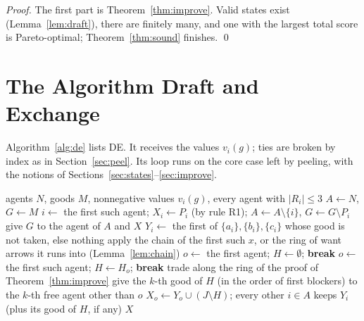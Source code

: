 \documentclass[runningheads,11pt]{llncs}
\newcommand{\DE}{\textup{DE}}
\begin{document}
\begin{proof}
The first part is Theorem~\ref{thm:improve}. Valid states exist (Lemma~\ref{lem:draft}), there are finitely many, and one with the largest total score is Pareto-optimal; Theorem~\ref{thm:sound} finishes. \qed
\end{proof}

\section{The Algorithm Draft and Exchange}\label{sec:algo}

Algorithm~\ref{alg:de} lists \DE{}. It receives the values $v_i(g)$; ties are broken by index as in Section~\ref{sec:peel}. Its loop runs on the core case left by peeling, with the notions of Sections~\ref{sec:states}--\ref{sec:improve}.

\begin{algorithm}[tb]
\caption{Draft and Exchange (\DE{})}\label{alg:de}
\begin{algorithmic}[1]
\Require agents $N$, goods $M$, nonnegative values $v_i(g)$, every agent with $|R_i|\le3$
\State $A\gets N$, $G\gets M$
 
  \State $i\gets$ the first such agent; $X_i\gets P_i$ (by rule R1); $A\gets A\setminus\{i\}$, $G\gets G\setminus P_i$
\EndWhile
{} give $G$ to the agent of $A$ and \Return $X$ \EndIf
{} 
  \State $Y_i\gets$ the first of $\{a_i\},\{b_i\},\{c_i\}$ whose good is not taken, else nothing
\EndFor
\Loop
   
    \State apply the chain of the first such $x$, or the ring of want arrows it runs into (Lemma~\ref{lem:chain})
   
    \State $o\gets$ the first agent; $H\gets\emptyset$; \textbf{break}
   
    \State $o\gets$ the first such agent; $H\gets H_o$; \textbf{break}
  \Else {}
    \State trade along the ring of the proof of Theorem~\ref{thm:improve}
  \EndIf
\EndLoop
\State give the $k$-th good of $H$ (in the order of first blockers) to the $k$-th free agent other than $o$
\State $X_o\gets Y_o\cup(J\setminus H)$; every other $i\in A$ keeps $Y_i$ (plus its good of $H$, if any)
\State \Return $X$
\end{algorithmic}
\end{algorithm}
\end{document}
